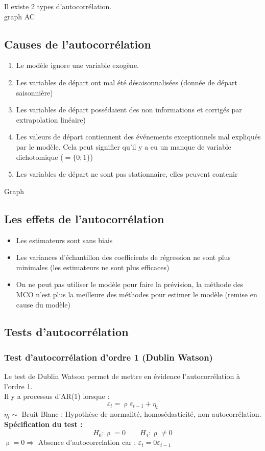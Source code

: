 \documentclass{article}
\begin{document}
Il existe 2 types d'autocorrélation. \\
graph AC

\subsection{Causes de l'autocorrélation}
\begin{enumerate}
	\item Le modèle ignore une variable exogène.
	\item Les variables de départ ont mal été désaisonnalisées (donnée de départ saisonnière)
	\item Les variables de départ possédaient des non informations et corrigés par extrapolation linéaire)
	\item Les valeurs de départ contiennent des événements exceptionnels mal expliqués par le modèle. Cela peut signifier qu'il y a eu un manque de variable dichotomique ($= \{0;1\}$)
	\item Les variables de départ ne sont pas stationnaire, elles peuvent contenir 
\end{enumerate}
Graph

\subsection{Les effets de l'autocorrélation}
\begin{itemize}
	\item Les estimateurs sont sans biais
	\item Les variances d'échantillon des coefficients de régression ne sont plus minimales (les estimateurs ne sont plus efficaces)
	\item On ne peut pas utiliser le modèle pour faire la prévision, la méthode des MCO n'est plus la meilleure des méthodes pour estimer le modèle (remise en cause du modèle)
\end{itemize}
\subsection{Tests d'autocorrélation}
\subsubsection{Test d'autocorrélation d'ordre 1 (Dublin Watson)}
Le test de Dublin Watson permet de mettre en évidence l'autocorrélation à l'ordre 1.\\
Il y a processus d'AR(1) lorsque :
\begin{equation*}
	\varepsilon_t = \uprho \varepsilon_{t-1} + \eta_t
\end{equation*}
$\eta_t \sim$ Bruit Blanc : Hypothèse de normalité, homosédasticité, non autocorrélation. \\
\textbf{Spécification du test :}
\begin{equation*}
	H_0 : \uprho = 0 \qquad H_1 : \uprho \neq 0
\end{equation*}
{\color{ForestGreen} $\uprho=0 \Rightarrow$ Absence d'autocorrelation car : $\varepsilon_t = 0\varepsilon_{t-1}$} 
\end{document}
